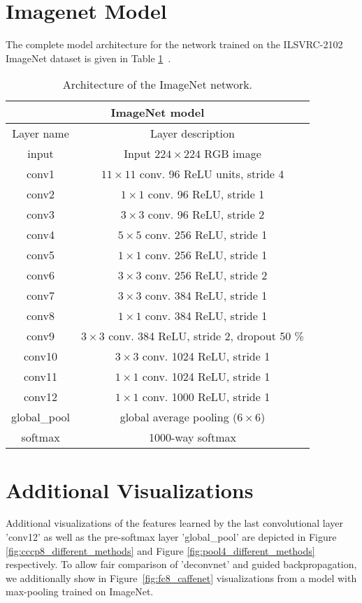 \documentclass{article} \usepackage{iclr2015,times}
\begin{document}
\begin{appendix}
\section{Imagenet Model}
The complete model architecture for the network trained on the ILSVRC-2102 ImageNet dataset is given in Table \ref{tbl:imagenet_net}~.
\newpage
\begin{table}[ht]
\caption{Architecture of the ImageNet network.}
\label{tbl:imagenet_net}
\begin{center}
\begin{tabular}{c|c}
\multicolumn{2}{c}{\textbf{ImageNet model}} \\ \hline
Layer name & Layer description \\ \hline
input & Input $224 \times 224$ RGB image\\
conv1 & $11 \times 11$ conv. 96 ReLU units, stride 4\\
conv2 & $1 \times 1$ conv. 96 ReLU, stride 1\\
conv3 & $3 \times 3$ conv. 96 ReLU, stride 2\\
conv4 & $5 \times 5$ conv. 256 ReLU, stride 1\\
conv5 & $1 \times 1$ conv. 256 ReLU, stride 1\\
conv6 & $3 \times 3$ conv. 256 ReLU, stride 2\\
conv7 & $3 \times 3$ conv. 384 ReLU, stride 1\\
conv8 & $1 \times 1$ conv. 384 ReLU, stride 1\\
conv9 & $3 \times 3$ conv. 384 ReLU, stride 2, dropout 50 \%\\
conv10 & $3 \times 3$ conv. 1024 ReLU, stride 1\\
conv11 & $1 \times 1$ conv. 1024 ReLU, stride 1\\
conv12 & $1 \times 1$ conv. 1000 ReLU, stride 1\\
global\_pool & global average pooling ($6 \times 6$)\\
softmax & 1000-way softmax
\end{tabular}
\end{center}
\end{table}

\section{Additional Visualizations}
Additional visualizations of the features learned by the last convolutional layer 'conv12' as well as the pre-softmax layer 'global\_pool' are depicted in Figure \ref{fig:cccp8_different_methods} and Figure \ref{fig:pool4_different_methods} respectively. To allow fair comparison of 'deconvnet' and guided backpropagation, we additionally show in Figure~\ref{fig:fc8_caffenet} visualizations from a model with max-pooling trained on ImageNet.


\end{appendix}
\end{document}
